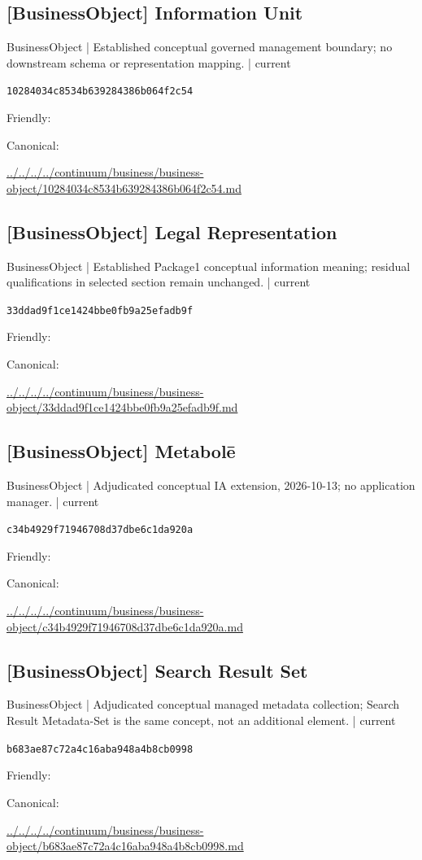 \documentclass[10pt,a4paper]{article}
\begin{document}
\subsection*{[BusinessObject] Information Unit}
{\small BusinessObject | Established conceptual governed management boundary; no downstream schema or representation mapping. | current}\par
\texttt{10284034c8534b639284386b064f2c54}\par
Friendly: \par
Canonical: \par
{\footnotesize\url{../../../../continuum/business/business-object/10284034c8534b639284386b064f2c54.md}}\par
\subsection*{[BusinessObject] Legal Representation}
{\small BusinessObject | Established Package1 conceptual information meaning; residual qualifications in selected section remain unchanged. | current}\par
\texttt{33ddad9f1ce1424bbe0fb9a25efadb9f}\par
Friendly: \par
Canonical: \par
{\footnotesize\url{../../../../continuum/business/business-object/33ddad9f1ce1424bbe0fb9a25efadb9f.md}}\par
\subsection*{[BusinessObject] Metabolē}
{\small BusinessObject | Adjudicated conceptual IA extension, 2026-10-13; no application manager. | current}\par
\texttt{c34b4929f71946708d37dbe6c1da920a}\par
Friendly: \par
Canonical: \par
{\footnotesize\url{../../../../continuum/business/business-object/c34b4929f71946708d37dbe6c1da920a.md}}\par
\subsection*{[BusinessObject] Search Result Set}
{\small BusinessObject | Adjudicated conceptual managed metadata collection; Search Result Metadata-Set is the same concept, not an additional element. | current}\par
\texttt{b683ae87c72a4c16aba948a4b8cb0998}\par
Friendly: \par
Canonical: \par
{\footnotesize\url{../../../../continuum/business/business-object/b683ae87c72a4c16aba948a4b8cb0998.md}}\par
\end{document}
